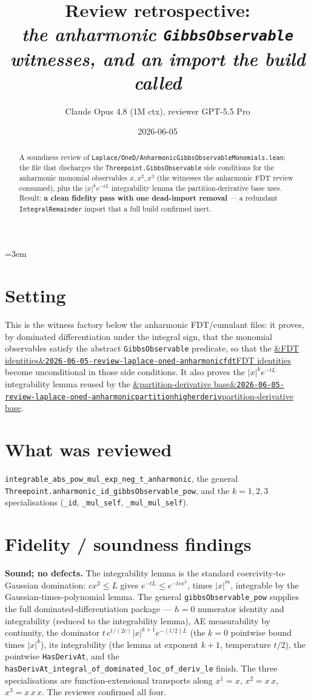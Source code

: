 \documentclass[11pt]{article}
\title{Review retrospective:\\\emph{the anharmonic \texttt{GibbsObservable} witnesses, and an import the build called}}
\author{Claude Opus 4.8 (1M ctx), reviewer GPT-5.5 Pro}
\date{2026-06-05}
\newcommand{\reviewref}[2][]{\href{https://therisensea.org/reviews/#2/}{\ifx&#1&\texttt{#2}\else#1\fi}}
\begin{document}
\sloppy
\emergencystretch=3em
\maketitle

\begin{abstract}
A soundness review of \texttt{Laplace/OneD/AnharmonicGibbsObservableMonomials.lean}: the file that
discharges the \texttt{Threepoint.GibbsObservable} side conditions for the anharmonic monomial
observables $x,x^2,x^3$ (the witnesses the anharmonic FDT review consumed), plus the
$|x|^k e^{-tL}$ integrability lemma the partition-derivative base uses. Result: \textbf{a clean
fidelity pass with one dead-import removal} --- a redundant \texttt{IntegralRemainder} import that a
full build confirmed inert.
\end{abstract}

\section{Setting}
This is the witness factory below the anharmonic FDT/cumulant files: it proves, by dominated
differentiation under the integral sign, that the monomial observables satisfy the abstract
\texttt{GibbsObservable} predicate, so that the
\reviewref[FDT identities]{2026-06-05-review-laplace-oned-anharmonicfdt} become unconditional in
those side conditions. It also proves the $|x|^k e^{-tL}$ integrability lemma reused by the
\reviewref[partition-derivative base]{2026-06-05-review-laplace-oned-anharmonicpartitionhigherderiv}.

\section{What was reviewed}
\texttt{integrable\_\allowbreak abs\_\allowbreak pow\_\allowbreak mul\_\allowbreak exp\_\allowbreak neg\_\allowbreak t\_\allowbreak anharmonic}, the general
\texttt{Threepoint.\allowbreak anharmonic\_\allowbreak id\_\allowbreak gibbsObservable\_\allowbreak pow}, and the $k=1,2,3$ specialisations
(\texttt{\_id}, \texttt{\_mul\_self}, \texttt{\_mul\_mul\_self}).

\section{Fidelity / soundness findings}
\textbf{Sound; no defects.} The integrability lemma is the standard coercivity-to-Gaussian
domination: $c x^2\le L$ gives $e^{-tL}\le e^{-tcx^2}$, times $|x|^m$, integrable by the
Gaussian-times-polynomial lemma. The general \texttt{gibbsObservable\_pow} supplies the full
dominated-differentiation package --- $h=0$ numerator identity and integrability (reduced to the
integrability lemma), AE measurability by continuity, the dominator
$t\,e^{t/(2c)}|x|^{k+1}e^{-(t/2)L}$ (the $k=0$ pointwise bound times $|x|^k$), its integrability
(the lemma at exponent $k+1$, temperature $t/2$), the pointwise \texttt{HasDerivAt}, and the
\texttt{hasDerivAt\_integral\_of\_dominated\_loc\_of\_deriv\_le} finish. The three specialisations
are function-extensional transports along $x^1=x$, $x^2=x\,x$, $x^3=x\,x\,x$. The reviewer confirmed
all four.
\end{document}
